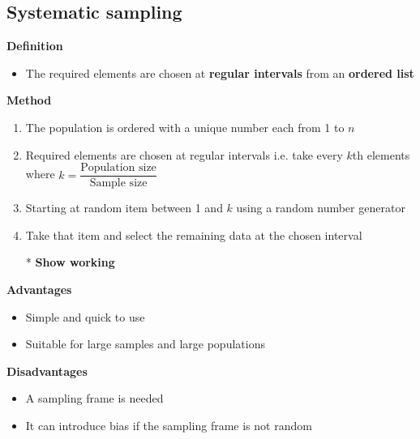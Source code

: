 \documentclass[oneside,fleqn,11pt]{book}
\begin{document}
	\subsection{Systematic sampling}
	\textbf{Definition}
	\begin{itemize}
		\item The required elements are chosen at \textbf{regular intervals} from an \textbf{ordered list}
	\end{itemize}
	\textbf{Method}
	\begin{enumerate}
		\item The population is ordered with a unique number each from 1 to $n$
		\item Required elements are chosen at regular intervals i.e. take every $k$th elements where $k=\dfrac{\text{Population size}}{\text{Sample size}}$
		\item Starting at random item between 1 and $k$ using a random number generator
		\item Take that item and select the remaining data at the chosen interval
		\item[*] \textbf{Show working}
	\end{enumerate}
	\textbf{Advantages}
	\begin{itemize}
		\item Simple and quick to use
		\item Suitable for large samples and large populations
	\end{itemize}
	\textbf{Disadvantages}
	\begin{itemize}
		\item A sampling frame is needed
		\item It can introduce bias if the sampling frame is not random
	\end{itemize}
\end{document}
